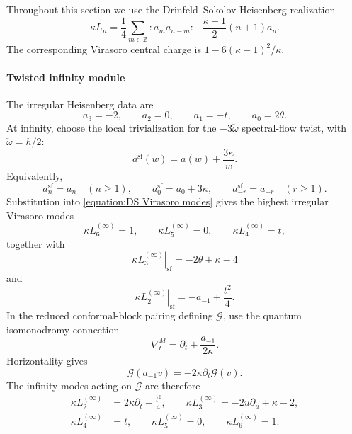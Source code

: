 \documentclass[a4paper,11pt]{article}
\numberwithin{equation}{section}
\begin{document}
Throughout this section we use the Drinfeld--Sokolov Heisenberg realization
\begin{equation}
	\label{equation:DS Virasoro modes}
	\kappa L_{n}
	=
	\frac{1}{4}
	\sum_{m\in\mathbb{Z}}:a_{m} a_{n-m}:
	-
	\frac{\kappa-1}{2}(n+1)a_{n} .
\end{equation}
The corresponding Virasoro central charge is
$1-6(\kappa-1)^{2}/\kappa$.


\paragraph*{Twisted infinity module}

The irregular Heisenberg data are
\begin{equation}
	a_{3}=-2,
	\qquad
	a_{2}=0,
	\qquad
	a_{1}=-t,
	\qquad
	a_{0}=2\theta .
\end{equation}
At infinity, choose the local trivialization for the
$-3\check{\omega}$ spectral-flow twist, with
$\check{\omega}=h/2$:
\begin{equation}
a^{\mathrm{sf}}(w)
	=
	a(w)
	+
	\frac{3\kappa}{w}.
\end{equation}
Equivalently,
\begin{equation}
	a_{n}^{\mathrm{sf}}=a_{n}
	\quad (n\geq 1),
	\qquad
	a_{0}^{\mathrm{sf}}=a_{0}+3\kappa,
	\qquad
	a_{-r}^{\mathrm{sf}}=a_{-r}
	\quad (r\geq 1).
\end{equation}
Substitution into \eqref{equation:DS Virasoro modes} gives the highest
irregular Virasoro modes
\begin{equation}
	\kappa L_{6}^{(\infty)}=1,
	\qquad
	\kappa L_{5}^{(\infty)}=0,
	\qquad
	\kappa L_{4}^{(\infty)}=t,
\end{equation}
together with
\begin{equation}
	\label{equation:twisted infinity L3}
	\left.
	\kappa L_{3}^{(\infty)}
	\right|_{\mathrm{sf}}
	=
	-2\theta+\kappa-4
\end{equation}
and
\begin{equation}
	\label{equation:twisted infinity L2}
	\left.
	\kappa L_{2}^{(\infty)}
	\right|_{\mathrm{sf}}
	=
	-a_{-1}
	+
	\frac{t^{2}}{4} .
\end{equation}
In the reduced conformal-block pairing defining $\mathcal{G}$, use
the quantum isomonodromy connection
\begin{equation}
	\nabla_{t}^{M}
	=
	\partial_{t}+\frac{a_{-1}}{2\kappa}.
\end{equation}
Horizontality gives
\begin{equation}
 \mathcal{G}(a_{-1}v)=-2\kappa\partial_{t}\mathcal{G}(v).
\end{equation}
The infinity modes acting on $\mathcal{G}$ are therefore
\begin{equation}
 \begin{aligned}
 \kappa L_{2}^{(\infty)}&=2\kappa\partial_{t}+\frac{t^{2}}{4},\qquad
 \kappa L_{3}^{(\infty)}=-2u\partial_{u}+\kappa-2,\\
 \kappa L_{4}^{(\infty)}&=t,\qquad
 \kappa L_{5}^{(\infty)}=0,\qquad
 \kappa L_{6}^{(\infty)}=1.
 \end{aligned}
\end{equation}
\end{document}
